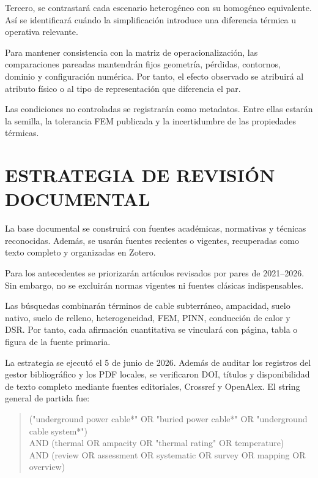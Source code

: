 \documentclass[11pt,a4paper,oneside]{report}
\newcommand{\tesisbodyfont}{\fontsize{11}{13.6}\selectfont}
\begin{document}
\begin{singlespace}
\begin{landscape}
Tercero, se contrastará cada escenario heterogéneo con su homogéneo equivalente. Así se identificará cuándo la simplificación introduce una diferencia térmica u operativa relevante.

Para mantener consistencia con la matriz de operacionalización, las comparaciones pareadas mantendrán fijos geometría, pérdidas, contornos, dominio y configuración numérica. Por tanto, el efecto observado se atribuirá al atributo físico o al tipo de representación que diferencia el par.

Las condiciones no controladas se registrarán como metadatos. Entre ellas estarán la semilla, la tolerancia FEM publicada y la incertidumbre de las propiedades térmicas.

\end{landscape}
\clearpage
\tesisbodyfont

\section{ESTRATEGIA DE REVISIÓN DOCUMENTAL}
\thispagestyle{empty}

La base documental se construirá con fuentes académicas, normativas y técnicas reconocidas. Además, se usarán fuentes recientes o vigentes, recuperadas como texto completo y organizadas en Zotero.

Para los antecedentes se priorizarán artículos revisados por pares de 2021--2026. Sin embargo, no se excluirán normas vigentes ni fuentes clásicas indispensables.

Las búsquedas combinarán términos de cable subterráneo, ampacidad, suelo nativo, suelo de relleno, heterogeneidad, FEM, PINN, conducción de calor y DSR. Por tanto, cada afirmación cuantitativa se vinculará con página, tabla o figura de la fuente primaria.

La estrategia se ejecutó el 5 de junio de 2026. Además de auditar los registros del gestor bibliográfico y los PDF locales, se verificaron DOI, títulos y disponibilidad de texto completo mediante fuentes editoriales, Crossref y OpenAlex. El string general de partida fue:

\begin{quote}\scriptsize\ttfamily\RaggedRight
("underground power cable*" OR "buried power cable*" OR "underground cable system*")\\
AND (thermal OR ampacity OR "thermal rating" OR temperature)\\
AND (review OR assessment OR systematic OR survey OR mapping OR overview)
\end{quote}


\end{singlespace}
\end{document}

